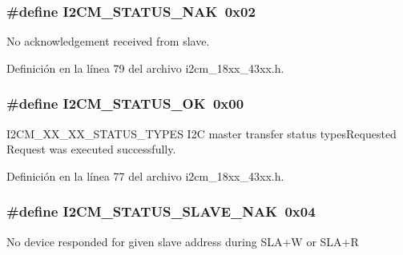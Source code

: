 \subsubsection[{\texorpdfstring{I2\+C\+M\+\_\+\+S\+T\+A\+T\+U\+S\+\_\+\+N\+AK}{I2CM_STATUS_NAK}}]{\setlength{\rightskip}{0pt plus 5cm}\#define I2\+C\+M\+\_\+\+S\+T\+A\+T\+U\+S\+\_\+\+N\+AK~0x02}\hypertarget{group___i2_c_m__18_x_x__43_x_x_ga3e37de80881a617b1fadceabbd9dc19f}{}\label{group___i2_c_m__18_x_x__43_x_x_ga3e37de80881a617b1fadceabbd9dc19f}
No acknowledgement received from slave. 

Definición en la línea 79 del archivo i2cm\+\_\+18xx\+\_\+43xx.\+h.

\subsubsection[{\texorpdfstring{I2\+C\+M\+\_\+\+S\+T\+A\+T\+U\+S\+\_\+\+OK}{I2CM_STATUS_OK}}]{\setlength{\rightskip}{0pt plus 5cm}\#define I2\+C\+M\+\_\+\+S\+T\+A\+T\+U\+S\+\_\+\+OK~0x00}\hypertarget{group___i2_c_m__18_x_x__43_x_x_gaef5f7d87e3e3b72c200d978bb19205c5}{}\label{group___i2_c_m__18_x_x__43_x_x_gaef5f7d87e3e3b72c200d978bb19205c5}
I2\+C\+M\+\_\+X\+X\+\_\+X\+X\+\_\+\+S\+T\+A\+T\+U\+S\+\_\+\+T\+Y\+P\+ES I2C master transfer status types\+Requested Request was executed successfully. 

Definición en la línea 77 del archivo i2cm\+\_\+18xx\+\_\+43xx.\+h.

\subsubsection[{\texorpdfstring{I2\+C\+M\+\_\+\+S\+T\+A\+T\+U\+S\+\_\+\+S\+L\+A\+V\+E\+\_\+\+N\+AK}{I2CM_STATUS_SLAVE_NAK}}]{\setlength{\rightskip}{0pt plus 5cm}\#define I2\+C\+M\+\_\+\+S\+T\+A\+T\+U\+S\+\_\+\+S\+L\+A\+V\+E\+\_\+\+N\+AK~0x04}\hypertarget{group___i2_c_m__18_x_x__43_x_x_ga5260bc325f40a9218d0596173c996f35}{}\label{group___i2_c_m__18_x_x__43_x_x_ga5260bc325f40a9218d0596173c996f35}
No device responded for given slave address during S\+L\+A+W or S\+L\+A+R 

